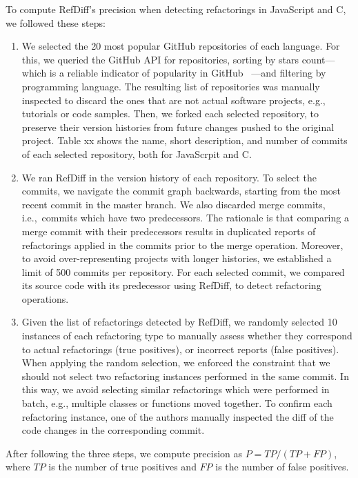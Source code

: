 To compute RefDiff's precision when detecting refactorings in JavaScript and C, we followed these steps:

\begin{enumerate}  
\item We selected the 20 most popular GitHub repositories of each language. For this, we queried the GitHub API for repositories, sorting by stars count---which is a reliable indicator of popularity in GitHub~\cite{icsme2016,jss-2018-github-stars} ---and filtering by programming language.
The resulting list of repositories was manually inspected to discard the ones that are not actual software projects, e.g., tutorials or code samples. Then, we forked each selected repository, to preserve their version histories from future changes pushed to the original project. Table xx shows the name, short description, and number of commits of each selected repository, both for JavaScrpit and C.  

\item We ran RefDiff in the version history of each repository. To select the commits, we navigate the commit graph backwards, starting from the most recent commit in the master branch. We also discarded merge commits, i.e.,~commits which have two predecessors. The rationale is that comparing a merge commit with their predecessors results in duplicated reports of refactorings applied in the commits prior to the merge operation. Moreover, to avoid over-representing projects with longer histories, we established a limit of 500 commits per repository. For each selected commit, we compared its source code with its predecessor using RefDiff, to detect refactoring operations.

\item Given the list of refactorings detected by RefDiff, we randomly selected 10 instances of each refactoring type to manually assess whether they correspond to actual refactorings (true positives), or incorrect reports (false positives).
When applying the random selection, we enforced the constraint that we should not select two refactoring instances performed in the same commit.
In this way, we avoid selecting similar refactorings which were performed in batch, e.g., multiple classes or functions moved together.
To confirm each refactoring instance, one of the authors manually inspected the diff of the code changes in the corresponding commit.
\end{enumerate}

After following the three steps, we compute precision as $P = \mathit{TP} / (\mathit{TP} + \mathit{FP})$, where $\mathit{TP}$ is the number of true positives and $\mathit{FP}$ is the number of false positives.



